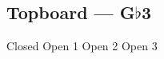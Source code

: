 \subsection[Topboard]{Topboard --- \UiKey{\I}\UiKey{\SET}G$\flat$3}









































Closed
Open 1
Open 2
Open 3
